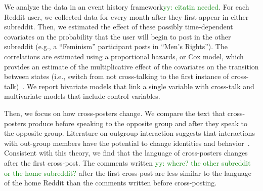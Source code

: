 \documentclass[letterpaper]{article}
\newcommand{\yy}[1]{{\textcolor{green}{yy: #1}}}
\begin{document}
We analyze the data in an event history framework\yy{citatin needed}. For each Reddit user, we collected data for every month after they first appear in either subreddit. Then, we estimated the effect of these possibly time-dependent covariates on the probability that the user will begin to post in the other subreddit (e.g., a ``Feminism'' participant posts in ``Men's Rights''). The correlations are estimated using a proportional hazards, or Cox model, which provides an estimate of the multiplicative effect of the covariates on the transition between states (i.e., switch from not cross-talking to the first instance of cross-talk)~\cite{yamaguchi1991eventhistanal}.  We report bivariate models that link a single variable with cross-talk and multivariate models that include control variables. 

Then, we focus on how cross-posters change. We compare the text that cross-posters produce before speaking to the opposite group and after they speak to the opposite group. Literature on outgroup interaction suggests that interactions with out-group members have the potential to change identities and behavior~\cite{brown1999changing}. Consistent with this theory, we find that the language of cross-posters changes after the first cross-post. The comments written \yy{where? the other subreddit or the home subreddit?} after the first cross-post are less similar to the language of the home Reddit than the comments written before cross-posting. 
\end{document}
